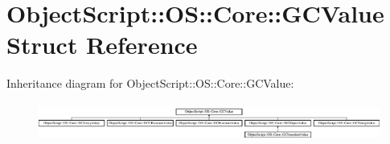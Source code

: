 \hypertarget{struct_object_script_1_1_o_s_1_1_core_1_1_g_c_value}{}\section{Object\+Script\+:\+:OS\+:\+:Core\+:\+:G\+C\+Value Struct Reference}
\label{struct_object_script_1_1_o_s_1_1_core_1_1_g_c_value}
Inheritance diagram for Object\+Script\+:\+:OS\+:\+:Core\+:\+:G\+C\+Value\+:\begin{figure}[H]
\begin{center}
\leavevmode
\includegraphics[height=1.277567cm]{struct_object_script_1_1_o_s_1_1_core_1_1_g_c_value}
\end{center}
\end{figure}
